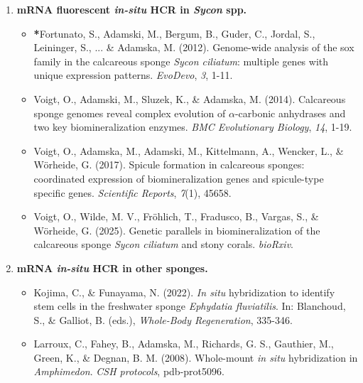 \documentclass[10pt]{report}
\begin{document}
\begin{enumerate}
	\item \textbf{mRNA fluorescent \textit{in-situ} HCR in \textit{Sycon} spp.}
		\begin{itemize}
			\item \textbf{*}Fortunato, S., Adamski, M., Bergum, B., Guder, C., Jordal, S., Leininger, S., ... \& Adamska, M. (2012). Genome-wide analysis of the sox family in the calcareous sponge \textit{Sycon ciliatum}: multiple genes with unique expression patterns. \textit{EvoDevo}, \textit{3}, 1-11. 
			\item Voigt, O., Adamski, M., Sluzek, K., \& Adamska, M. (2014). Calcareous sponge genomes reveal complex evolution of $\alpha$-carbonic anhydrases and two key biomineralization enzymes. \textit{BMC Evolutionary Biology}, \textit{14}, 1-19. \\ 
			\item Voigt, O., Adamska, M., Adamski, M., Kittelmann, A., Wencker, L., \& W{\"o}rheide, G. (2017). Spicule formation in calcareous sponges: coordinated expression of biomineralization genes and spicule-type specific genes. \textit{Scientific Reports}, \textit{7}(1), 45658. 
			\item Voigt, O., Wilde, M. V., Fröhlich, T., Fradusco, B., Vargas, S., \& W{\"o}rheide, G. (2025). Genetic parallels in biomineralization of the calcareous sponge \textit{Sycon ciliatum} and stony corals. \textit{bioRxiv}. 
		\end{itemize}
	\item \textbf{mRNA \textit{in-situ} HCR in other sponges.}
		\begin{itemize}
			\item Kojima, C., \& Funayama, N. (2022). \textit{In situ} hybridization to identify stem cells in the freshwater sponge \textit{Ephydatia fluviatilis}. In: Blanchoud, S., \& Galliot, B. (eds.), \textit{Whole-Body Regeneration}, 335-346. \\ 
			\item Larroux, C., Fahey, B., Adamska, M., Richards, G. S., Gauthier, M., Green, K., \& Degnan, B. M. (2008). Whole-mount \textit{in situ} hybridization in \textit{Amphimedon}. \textit{CSH protocols}, pdb-prot5096. 

\end{itemize}
\end{enumerate}
\end{document}
